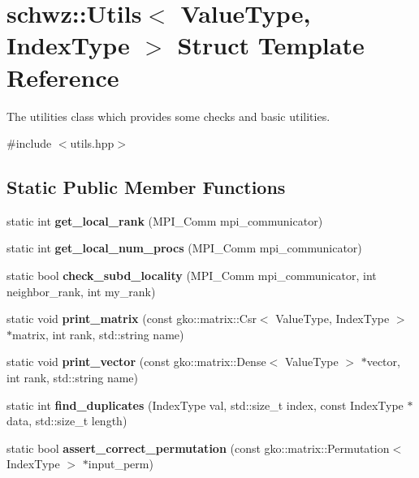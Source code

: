\hypertarget{structschwz_1_1Utils}{}\section{schwz\+:\+:Utils$<$ Value\+Type, Index\+Type $>$ Struct Template Reference}
\label{structschwz_1_1Utils}


The utilities class which provides some checks and basic utilities.  




{\ttfamily \#include $<$utils.\+hpp$>$}

\subsection*{Static Public Member Functions}
\begin{DoxyCompactItemize}
\item 
\mbox{\label{structschwz_1_1Utils_a6f65fc83d6270453712a2600bab557ce}} 
static int {\bfseries get\+\_\+local\+\_\+rank} (M\+P\+I\+\_\+\+Comm mpi\+\_\+communicator)
\item 
\mbox{\label{structschwz_1_1Utils_a33d613297cb2b53634c1ed2b44fe595c}} 
static int {\bfseries get\+\_\+local\+\_\+num\+\_\+procs} (M\+P\+I\+\_\+\+Comm mpi\+\_\+communicator)
\item 
\mbox{\label{structschwz_1_1Utils_a18df4f61989071e018f64ac7d7a1d6f1}} 
static bool {\bfseries check\+\_\+subd\+\_\+locality} (M\+P\+I\+\_\+\+Comm mpi\+\_\+communicator, int neighbor\+\_\+rank, int my\+\_\+rank)
\item 
\mbox{\label{structschwz_1_1Utils_a6f0494e5c7d6be0585e26efd1d1fa64c}} 
static void {\bfseries print\+\_\+matrix} (const gko\+::matrix\+::\+Csr$<$ Value\+Type, Index\+Type $>$ $\ast$matrix, int rank, std\+::string name)
\item 
\mbox{\label{structschwz_1_1Utils_a1abe3d1bde2091a0361f8beadb925f70}} 
static void {\bfseries print\+\_\+vector} (const gko\+::matrix\+::\+Dense$<$ Value\+Type $>$ $\ast$vector, int rank, std\+::string name)
\item 
\mbox{\label{structschwz_1_1Utils_a391ddf4f24fb8d7c7ffacf8f046f94b5}} 
static int {\bfseries find\+\_\+duplicates} (Index\+Type val, std\+::size\+\_\+t index, const Index\+Type $\ast$data, std\+::size\+\_\+t length)
\item 
\mbox{\label{structschwz_1_1Utils_a324726628a2cc9e0021069f5a060a140}} 
static bool {\bfseries assert\+\_\+correct\+\_\+permutation} (const gko\+::matrix\+::\+Permutation$<$ Index\+Type $>$ $\ast$input\+\_\+perm)
\end{DoxyCompactItemize}


